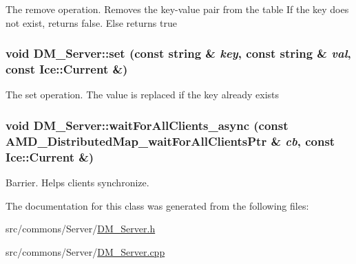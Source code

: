 \label{class_d_m___server_af60a2b4c3d5f5bfaceaa09797ecf54f8}
The remove operation. Removes the key-\/value pair from the table If the key does not exist, returns false. Else returns true \hypertarget{class_d_m___server_af56ffe1e8d40e23d30f4bf1a93b1a6c8}{
\subsubsection[{set}]{\setlength{\rightskip}{0pt plus 5cm}void DM\_\-Server::set (const string \& {\em key}, \/  const string \& {\em val}, \/  const Ice::Current \&)}}
\label{class_d_m___server_af56ffe1e8d40e23d30f4bf1a93b1a6c8}
The set operation. The value is replaced if the key already exists \hypertarget{class_d_m___server_adedd58e27509b0a4eeebbc08cb5c20d8}{
\subsubsection[{waitForAllClients\_\-async}]{\setlength{\rightskip}{0pt plus 5cm}void DM\_\-Server::waitForAllClients\_\-async (const AMD\_\-DistributedMap\_\-waitForAllClientsPtr \& {\em cb}, \/  const Ice::Current \&)}}
\label{class_d_m___server_adedd58e27509b0a4eeebbc08cb5c20d8}


Barrier. Helps clients synchronize. 



The documentation for this class was generated from the following files:\begin{DoxyCompactItemize}
\item 
src/commons/Server/\hyperlink{_d_m___server_8h}{DM\_\-Server.h}\item 
src/commons/Server/\hyperlink{_d_m___server_8cpp}{DM\_\-Server.cpp}\end{DoxyCompactItemize}
